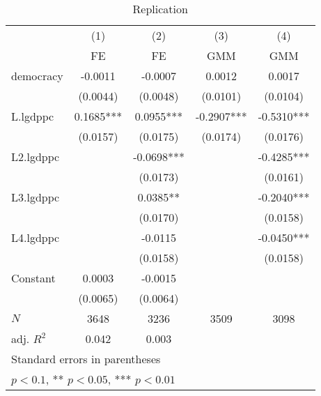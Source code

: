 \begin{table}[htbp]\centering
\def\sym#1{\ifmmode^{#1}\else\(^{#1}\)\fi}
\caption{Replication \label{tab:regression1}}
\begin{tabular}{l*{4}{c}}
\hline\hline
            &\multicolumn{1}{c}{(1)}&\multicolumn{1}{c}{(2)}&\multicolumn{1}{c}{(3)}&\multicolumn{1}{c}{(4)}\\
            &\multicolumn{1}{c}{FE}&\multicolumn{1}{c}{FE}&\multicolumn{1}{c}{GMM}&\multicolumn{1}{c}{GMM}\\
\hline
democracy   &     -0.0011   &     -0.0007   &      0.0012   &      0.0017   \\
            &    (0.0044)   &    (0.0048)   &    (0.0101)   &    (0.0104)   \\
[1em]
L.lgdppc    &      0.1685***&      0.0955***&     -0.2907***&     -0.5310***\\
            &    (0.0157)   &    (0.0175)   &    (0.0174)   &    (0.0176)   \\
[1em]
L2.lgdppc   &               &     -0.0698***&               &     -0.4285***\\
            &               &    (0.0173)   &               &    (0.0161)   \\
[1em]
L3.lgdppc   &               &      0.0385** &               &     -0.2040***\\
            &               &    (0.0170)   &               &    (0.0158)   \\
[1em]
L4.lgdppc   &               &     -0.0115   &               &     -0.0450***\\
            &               &    (0.0158)   &               &    (0.0158)   \\
[1em]
Constant    &      0.0003   &     -0.0015   &               &               \\
            &    (0.0065)   &    (0.0064)   &               &               \\
\hline
\(N\)       &        3648   &        3236   &        3509   &        3098   \\
adj. \(R^{2}\)&       0.042   &       0.003   &               &               \\
\hline\hline
\multicolumn{5}{l}{\footnotesize Standard errors in parentheses}\\
\multicolumn{5}{l}{\footnotesize * \(p<0.1\), ** \(p<0.05\), *** \(p<0.01\)}\\
\end{tabular}
\end{table}

